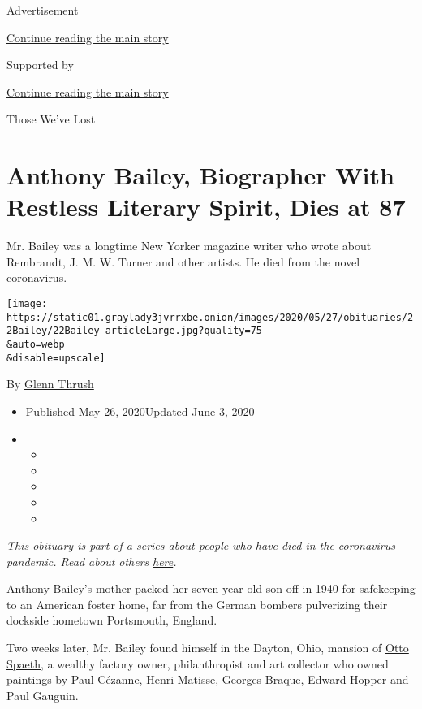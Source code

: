 Advertisement

\protect\hyperlink{after-top}{Continue reading the main story}

Supported by

\protect\hyperlink{after-sponsor}{Continue reading the main story}

Those We've Lost

\hypertarget{anthony-bailey-biographer-with-restless-literary-spirit-dies-at-87}{%
\section{Anthony Bailey, Biographer With Restless Literary Spirit, Dies
at
87}\label{anthony-bailey-biographer-with-restless-literary-spirit-dies-at-87}}

Mr. Bailey was a longtime New Yorker magazine writer who wrote about
Rembrandt, J. M. W. Turner and other artists. He died from the novel
coronavirus.

\texttt{[image: https://static01.graylady3jvrrxbe.onion/images/2020/05/27/obituaries/22Bailey/22Bailey-articleLarge.jpg?quality=75\\\&auto=webp\\\&disable=upscale]}

By \href{https://www.nytimes3xbfgragh.onion/by/glenn-thrush}{Glenn
Thrush}

\begin{itemize}
\item
  Published May 26, 2020Updated June 3, 2020
\item
  \begin{itemize}
  \item
  \item
  \item
  \item
  \item
  \end{itemize}
\end{itemize}

\emph{This obituary is part of a series about people who have died in
the coronavirus pandemic. Read about others}
\href{https://www.nytimes3xbfgragh.onion/series/people-who-have-died-of-the-coronavirus}{\emph{here}}\emph{.}

Anthony Bailey's mother packed her seven-year-old son off in 1940 for
safekeeping to an American foster home, far from the German bombers
pulverizing their dockside hometown Portsmouth, England.

Two weeks later, Mr. Bailey found himself in the Dayton, Ohio, mansion
of
\href{https://www.nytimes3xbfgragh.onion/1966/10/09/archives/otto-spaeth-dies-art-collector-69-former-whitney-executive-was.html}{Otto
Spaeth}, a wealthy factory owner, philanthropist and art collector who
owned paintings by Paul Cézanne, Henri Matisse, Georges Braque, Edward
Hopper and Paul Gauguin.

